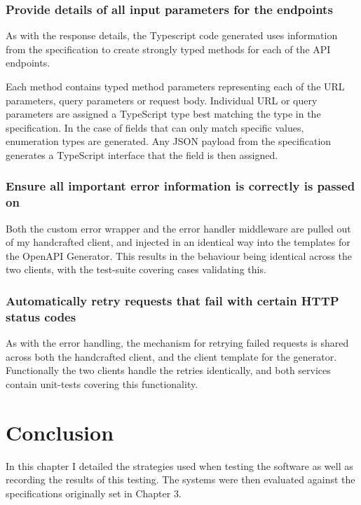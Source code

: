 \subsubsection{Provide details of all input parameters for the endpoints}
As with the response details, the Typescript code generated uses information from the specification to create strongly typed methods for each of the API endpoints. 

Each method contains typed method parameters representing each of the URL parameters, query parameters or request body. Individual URL or query parameters are assigned a TypeScript type best matching the type in the specification. In the case of fields that can only match specific values, enumeration types are generated. Any JSON payload from the specification generates a TypeScript interface that the field is then assigned.
\subsubsection{Ensure all important error information is correctly is passed on}
Both the custom error wrapper and the error handler middleware are pulled out of my handcrafted client, and injected in an identical way into the templates for the OpenAPI Generator. This results in the behaviour being identical across the two clients, with the test-suite covering cases validating this.
\subsubsection{Automatically retry requests that fail with certain HTTP status codes}
As with the error handling, the mechanism for retrying failed requests is shared across both the handcrafted client, and the client template for the generator.  Functionally the two clients handle the retries identically, and both services contain unit-tests covering this functionality.

\section{Conclusion}
In this chapter I detailed the strategies used when testing the software as well as recording the results of this testing. The systems were then evaluated against the specifications originally set in Chapter 3.